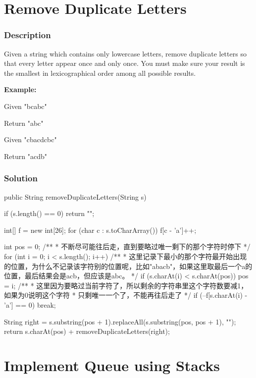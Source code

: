 \newpage

\section{Remove Duplicate Letters} %

\subsubsection{Description}
Given a string which contains only lowercase letters, remove duplicate letters so that every letter appear once and only once. You must make sure your result is the smallest in lexicographical order among all possible results.

\textbf{Example:}

Given "bcabc"

Return "abc"

Given "cbacdcbc"

Return "acdb"

\subsubsection{Solution}

\begin{Code}
public String removeDuplicateLetters(String s) {
    if (s.length() == 0) {
        return "";
    }

    int[] f = new int[26];
    for (char c : s.toCharArray()) {
        f[c - 'a']++;
    }

    int pos = 0;
    /**
     * 不断尽可能往后走，直到要略过唯一剩下的那个字符时停下
     */
    for (int i = 0; i < s.length(); i++) {
        /**
         * 这里记录下最小的那个字符最开始出现的位置，为什么不记录该字符别的位置呢，比如"abacb"，如果这里取最后一个a的位置，最后结果会是acb，但应该是abc。
         */
        if (s.charAt(i) < s.charAt(pos)) {
            pos = i;
        }
        /**
         * 这里因为要略过当前字符了，所以剩余的字符串里这个字符数要减1，如果为0说明这个字符
         * 只剩唯一一个了，不能再往后走了
         */
        if (--f[s.charAt(i) - 'a'] == 0) {
            break;
        }
    }

    String right = s.substring(pos + 1).replaceAll(s.substring(pos, pos + 1), "");
    return s.charAt(pos) + removeDuplicateLetters(right);
}
\end{Code}

\newpage

\section{Implement Queue using Stacks} %

